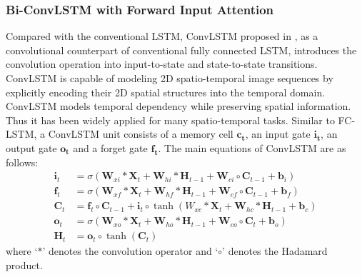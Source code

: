 \documentclass{bmvc2k}
\begin{document}
\subsubsection{Bi-ConvLSTM with Forward Input Attention}
\label{sec:attconvlstm}
Compared with the conventional LSTM, ConvLSTM proposed in \cite{Shi2015Convolutional}, as a convolutional counterpart of conventional fully connected LSTM, introduces the convolution operation into input-to-state and state-to-state transitions. ConvLSTM is capable of modeling 2D spatio-temporal image sequences by explicitly encoding their 2D spatial structures into the temporal domain. ConvLSTM models temporal dependency while preserving spatial information. Thus it has been widely applied for many spatio-temporal  tasks. Similar to FC-LSTM, a ConvLSTM unit consists of a memory cell  $\mathbf{c _ { t }}$, an input gate  $\mathbf{i _{ t }}$, an output gate  $\mathbf{o _{ t }}$ and a forget gate  $\mathbf{f_{ t }}$. The main equations of ConvLSTM are as follows:
\begin{equation}
    \begin{aligned}
    \mathbf{i}_{t} &=\sigma\left(\mathbf{W}_{x i} * \mathbf{X}_{t}+\mathbf{W}_{h i} * \mathbf{H}_{t-1}+\mathbf{W}_{c i} \circ \mathbf{C}_{t-1}+\mathbf{b}_{i}\right) \\
    \mathbf{f}_{t} &=\sigma\left(\mathbf{W}_{x f} * \mathbf{X}_{t}+\mathbf{W}_{h f} * \mathbf{H}_{t-1}+\mathbf{W}_{c f} \circ \mathbf{C}_{t-1}+\mathbf{b}_{f}\right) \\
    \mathbf{C}_{t} &=\mathbf{f}_{t} \circ \mathbf{C}_{t-1}+\mathbf{i}_{t} \circ \tanh \left(W_{x c} * \mathbf{X}_{t}+\mathbf{W}_{h c} * \mathbf{H}_{t-1}+\mathbf{b}_{c}\right) \\
    \mathbf{o}_{t} &=\sigma\left(\mathbf{W}_{x o} * \mathbf{X}_{t}+\mathbf{W}_{h o} * \mathbf{H}_{t-1}+\mathbf{W}_{c o} \circ \mathbf{C}_{t}+\mathbf{b}_{o}\right) \\
    \mathbf{H}_{t} &=\mathbf{o}_{t} \circ \tanh \left(\mathbf{C}_{t}\right)
    \end{aligned}
\end{equation}
where `$\ast$' denotes the convolution operator and `$\circ$' denotes the Hadamard product. 
\end{document}
